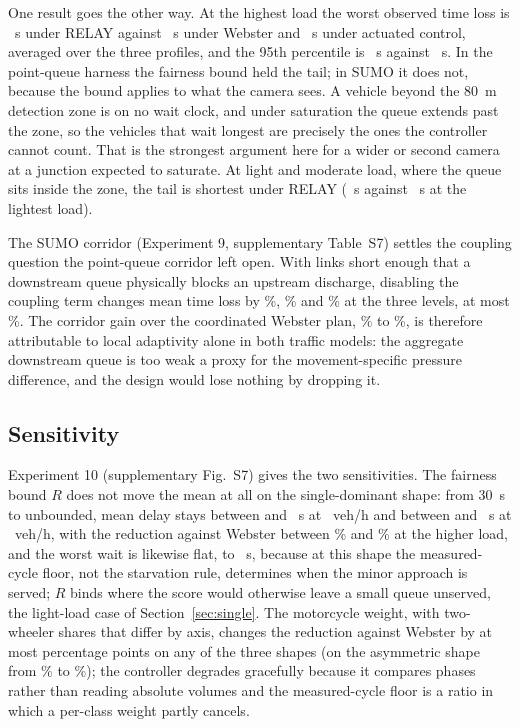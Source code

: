 \documentclass[journal]{IEEEtran}
\newcommand{\relay}{RELAY}
\begin{document}
One result goes the other way. At the highest load the worst observed time loss is
\SumoHighMaxRelay~s under \relay{} against \SumoHighMaxWebster~s under Webster and \SumoHighMaxActuated~s under
actuated control, averaged over the three profiles, and the 95th percentile is \SumoHighPNinetyFiveRelay~s
against \SumoHighPNinetyFiveWebster~s. In the point-queue harness the fairness bound held the tail; in SUMO it
does not, because the bound applies to what the camera sees. A vehicle beyond the 80~m detection zone is on no
wait clock, and under saturation the queue extends past the zone, so the vehicles that wait longest are
precisely the ones the controller cannot count. That is the strongest argument here for a wider or second
camera at a junction expected to saturate. At light and moderate load, where the queue sits inside the zone, the tail is
shortest under \relay{} (\SumoLowPNinetyFiveRelay~s against \SumoLowPNinetyFiveWebster~s at the lightest load).

The SUMO corridor (Experiment 9, supplementary Table~S7) settles the coupling question the point-queue
corridor left open. With links short enough
that a downstream queue physically blocks an upstream discharge, disabling the coupling term changes mean time
loss by \ScorrLowRedIsolated\%, \ScorrMidRedIsolated\% and \ScorrHighRedIsolated\% at the three levels, at most
\ScorrCoupleAbsMax\%. The corridor gain over the coordinated Webster plan, \ScorrRedCoordMin\% to
\ScorrRedCoordMax\%, is therefore attributable to local adaptivity alone in both traffic models: the aggregate
downstream queue is too weak a proxy for the movement-specific pressure difference, and the design would lose
nothing by dropping it.

\subsection{Sensitivity}
\label{sec:sensitivity}

Experiment 10 (supplementary Fig.~S7) gives the two sensitivities. The fairness bound $R$ does not move the
mean at all on the single-dominant shape: from 30~s to unbounded, mean delay stays between \SensMidMeanMin{}
and \SensMidMeanMax~s at \SensMidDemand~veh/h and between \SensHighMeanMin{} and \SensHighMeanMax~s at
\SensHighDemand~veh/h, with the reduction against Webster between \SensHighRedMin\% and \SensHighRedMax\% at
the higher load, and the worst wait is likewise flat, \SensMidMaxWaitMin{} to \SensMidMaxWaitMax~s, because
at this shape the measured-cycle floor, not the starvation rule, determines when the minor approach is
served; $R$ binds where the score would otherwise leave a small queue unserved, the light-load case of
Section~\ref{sec:single}. The motorcycle weight, with two-wheeler shares that differ by axis, changes the reduction against Webster by at most \SensMotoSpread{} percentage points on any of the three
shapes (on the asymmetric shape from \SensMotoAsymmetricRedMin\% to \SensMotoAsymmetricRedMax\%); the controller degrades gracefully because it compares phases rather than reading absolute volumes and
the measured-cycle floor is a ratio in which a per-class weight partly cancels.
\end{document}
